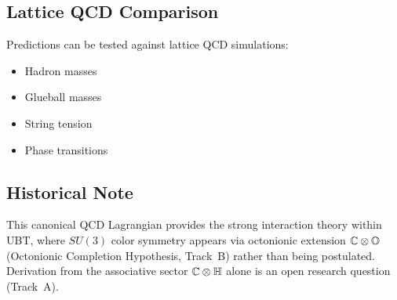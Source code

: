 \subsection{Lattice QCD Comparison}

Predictions can be tested against lattice QCD simulations:
\begin{itemize}
    \item Hadron masses
    \item Glueball masses
    \item String tension
    \item Phase transitions
\end{itemize}

\subsection{Historical Note}

This canonical QCD Lagrangian provides the strong interaction theory within UBT, where $SU(3)$ color symmetry appears via octonionic extension $\mathbb C \otimes \mathbb O$ (Octonionic Completion Hypothesis, Track~B) rather than being postulated. Derivation from the associative sector $\mathbb C \otimes \mathbb H$ alone is an open research question (Track~A).

